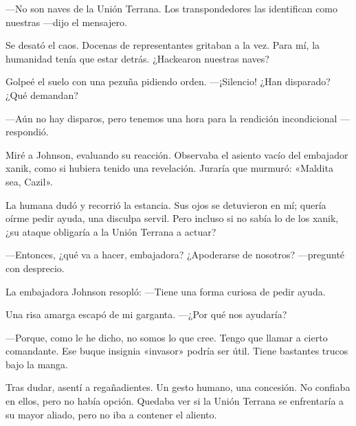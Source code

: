 —No son naves de la Unión Terrana. Los transpondedores las identifican como nuestras —dijo el mensajero.

Se desató el caos. Docenas de representantes gritaban a la vez. Para mí, la humanidad tenía que estar detrás. ¿Hackearon nuestras naves?

Golpeé el suelo con una pezuña pidiendo orden. —¡Silencio! ¿Han disparado? ¿Qué demandan?

—Aún no hay disparos, pero tenemos una hora para la rendición incondicional —respondió.

Miré a Johnson, evaluando su reacción. Observaba el asiento vacío del embajador xanik, como si hubiera tenido una revelación. Juraría que murmuró: «Maldita sea, Cazil».

La humana dudó y recorrió la estancia. Sus ojos se detuvieron en mí; quería oírme pedir ayuda, una disculpa servil. Pero incluso si no sabía lo de los xanik, ¿su ataque obligaría a la Unión Terrana a actuar?

—Entonces, ¿qué va a hacer, embajadora? ¿Apoderarse de nosotros? —pregunté con desprecio.

La embajadora Johnson resopló: —Tiene una forma curiosa de pedir ayuda.

Una risa amarga escapó de mi garganta. —¿Por qué nos ayudaría?

—Porque, como le he dicho, no somos lo que cree. Tengo que llamar a cierto comandante. Ese buque insignia «invasor» podría ser útil. Tiene bastantes trucos bajo la manga.

Tras dudar, asentí a regañadientes. Un gesto humano, una concesión. No confiaba en ellos, pero no había opción. Quedaba ver si la Unión Terrana se enfrentaría a su mayor aliado, pero no iba a contener el aliento.